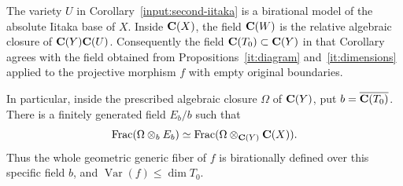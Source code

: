 \begin{corollary}
\label{ordinary:absolute-bases}
\label{prop:full-descent}
The variety $U$ in Corollary~\ref{input:second-iitaka} is a
birational model of the absolute Iitaka base of $X$. Inside
$\mathbf C(X)$, the field $\mathbf C(W)$ is the relative algebraic closure of
$\mathbf C(Y)\mathbf C(U)$. Consequently the field $\mathbf C(T_0)\subset\mathbf C(Y)$
in that Corollary agrees with the field obtained from
Propositions~\ref{it:diagram} and~\ref{it:dimensions} applied to
the projective morphism $f$ with empty original boundaries.

In particular, inside the prescribed algebraic closure $\Omega$
of $\mathbf C(Y)$, put $b=\overline{\mathbf C(T_0)}$. There is a finitely
generated field $E_b/b$ such that
\begin{equation}\label{ordinary:whole-field}
 \operatorname{Frac}(\Omega\otimes_bE_b)
 \simeq
 \operatorname{Frac}(\Omega\otimes_{\mathbf C(Y)}\mathbf C(X)).
\end{equation}
Thus the whole geometric generic fiber of $f$ is birationally
defined over this specific field $b$, and
$\operatorname{Var}(f)\leq\dim T_0$.
\end{corollary}

